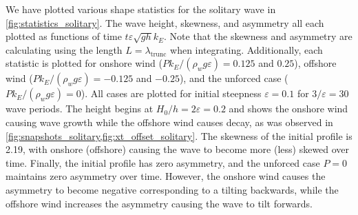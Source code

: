 \documentclass{jfm}
\renewcommand*{\epsilon}{\varepsilon}
\begin{document}
We have plotted various shape statistics for the solitary wave in
\cref{fig:statistics_solitary}.
The  wave height,
 skewness, and
 asymmetry all each plotted as
functions of time $t \epsilon \sqrt{g h} k_E$.
Note that the skewness and asymmetry are calculating using the length $L
= \lambda_{\text{trunc}}$ when integrating.
Additionally, each statistic is plotted for onshore wind ($P
k_E/(\rho_w g \epsilon) = 0.125$ and $0.25$), offshore wind ($P
k_E/(\rho_w g \epsilon) = -0.125$ and $-0.25$), and the unforced case
($P k_E/(\rho_w g \epsilon) = 0$).
All cases are plotted for initial steepness $\epsilon = 0.1$ for
$3/\epsilon = 30$ wave periods.
The height  begins at $H_0/h = 2
\epsilon = 0.2$ and shows the onshore wind
causing wave growth while the offshore wind causes decay, as was
observed in \cref{fig:snapshots_solitary,fig:xt_offset_solitary}.
The skewness of the initial profile is \num{2.19}, with onshore
(offshore) causing the wave to become more (less) skewed over time.
Finally, the initial profile has zero asymmetry, and the unforced case
$P=0$ maintains zero asymmetry over time.
However, the onshore wind causes the asymmetry to become negative
corresponding to a tilting backwards, while the offshore wind increases
the asymmetry causing the wave to tilt forwards.

\appendix
\end{document}
